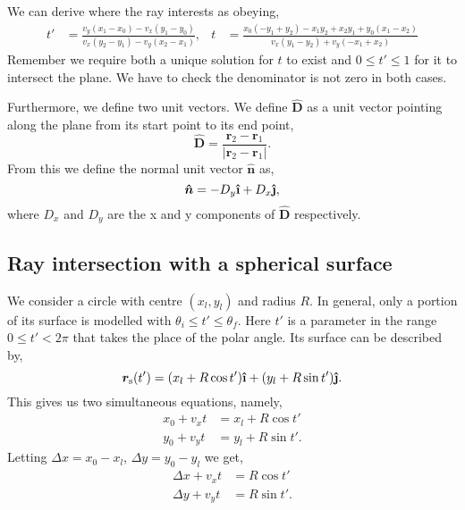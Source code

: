 \documentclass{article}
\let\vec \bm
\newcommand{\uveci}{{\bm{\hat{\textnormal{\bfseries\i}}}}}
\newcommand{\uvecj}{{\bm{\hat{\textnormal{\bfseries\j}}}}}
\begin{document}
We can derive where the ray interests as obeying,
\begin{align}
    t'
    &=
    \frac{v_y(x_1 - x_0) - v_x(y_1 - y_0)}{v_x(y_2 - y_1) - v_y(x_2 - x_1)}, &
    t
    &=
    \frac{x_{0} \left(- y_{1} + y_{2}\right) - x_{1} y_{2} + x_{2} y_{1} + y_{0} \left(x_{1} - x_{2}\right)}{v_{x} \left(y_{1} - y_{2}\right) + v_{y} \left(- x_{1} + x_{2}\right)}
\end{align}
Remember we require both a unique solution for $t$ to exist and $0 \le t' \le 1$ for it to intersect the plane. We have to check the denominator is not zero in both cases.

Furthermore, we define two unit vectors. We define $\vec{\hat{D}}$ as a unit vector pointing along the plane from its start point to its end point,
\begin{equation}
    \vec{\hat{D}}
    =
    \frac{\vec{r}_2 - \vec{r}_1}{|\vec{r}_2 - \vec{r}_1|}.
\end{equation}
From this we define the normal unit vector $\vec{\hat n}$ as,
\begin{equation}
\label{eq:normal_vec_def}
    \vec{\hat n}
    =
    - D_y \uveci + D_x \uvecj,
\end{equation}
where $D_x$ and $D_y$ are the x and y components of $\vec{\hat {D}}$ respectively.

\subsection{Ray intersection with a spherical surface}
We consider a circle with centre $(x_l, y_l)$ and radius $R$. In general, only a portion of its surface is modelled with $\theta_i \le t' \le \theta_f$. Here $t'$ is a parameter in the range $0 \le t' < 2\pi$ that takes the place of the polar angle. Its surface can be described by,
\begin{equation}
    \vec{r}_\mathrm{s}(t')
    =
    (x_l + R\cos t') \uveci
    +
    (y_l + R\sin t') \uvecj.
\end{equation}
This gives us two simultaneous equations, namely,
\begin{align}
    x_0 + v_x t &= x_l + R\cos t' \\
    y_0 + v_y t &= y_l + R\sin t'.
\end{align}
Letting $\Delta x = x_0 - x_l$, $\Delta y = y_0 - y_l$ we get,
\begin{align}
\label{eq:sph_simulataneous_1}
    \Delta x + v_x t &= R\cos t' \\
\label{eq:sph_simulataneous_2}
    \Delta y + v_y t &= R\sin t'.
\end{align}
\end{document}
